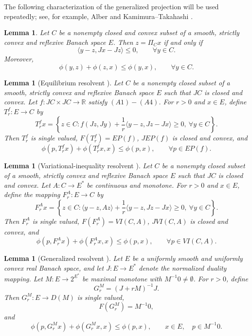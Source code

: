 \documentclass[leqno,12pt]{amsart}
\newtheorem{lemma}[theorem]{Lemma}
\theoremstyle{definition}
\numberwithin{equation}{section}
\begin{document}
The following characterization of the generalized projection will be used repeatedly; see, for example, Alber \cite{Alber1996} and Kamimura--Takahashi \cite{KamimuraTakahashi2002}.

\begin{lemma}\label{projectionlemma}
Let $C$ be a nonempty closed and convex subset of a smooth, strictly convex and reflexive Banach space $E$. Then $z=\Pi_Cx$ if and only if
\[
\langle y-z,Jx-Jz\rangle\leq 0,\qquad \forall y\in C.
\]
Moreover,
\[
\phi(y,z)+\phi(z,x)\leq \phi(y,x),\qquad \forall y\in C.
\]
\end{lemma}


\begin{lemma}[Equilibrium resolvent \cite{TakahashiZembayashi2008}]\label{EPrezolvent}
Let $C$ be a nonempty closed subset of a smooth, strictly convex and reflexive Banach space $E$ such that $JC$ is closed and convex. Let $f:JC\times JC\to\mathbb{R}$ satisfy $(A1)-(A4)$. For $r>0$ and $x\in E$, define $T_r^f:E\to C$ by
\[
T_r^f x=\left\{z\in C:f(Jz,Jy)+\frac{1}{r}\langle y-z,Jz-Jx\rangle\geq 0,\ \forall y\in C\right\}.
\]
Then $T_r^f$ is single valued, $F(T_r^f)=EP(f)$, $JEP(f)$ is closed and convex, and
\[
\phi(p,T_r^f x)+\phi(T_r^f x,x)\leq \phi(p,x),\qquad \forall p\in EP(f).
\]
\end{lemma}

\begin{lemma}[Variational-inequality resolvent \cite{ZegeyeShahzad2014}]\label{VIrezolvent}
Let $C$ be a nonempty closed subset of a smooth, strictly convex and reflexive Banach space $E$ such that $JC$ is closed and convex. Let $A:C\to E^{*}$ be continuous and monotone. For $r>0$ and $x\in E$, define the mapping $F_r^A:E\to C$ by
\[
F_r^A x=\left\{z\in C:\langle y-z,Az\rangle+\frac{1}{r}\langle y-z,Jz-Jx\rangle\geq 0,\ \forall y\in C\right\}.
\]
Then $F_r^A$ is single valued, $F(F_r^A)=VI(C,A)$, $JVI(C,A)$ is closed and convex, and
\[
\phi(p,F_r^A x)+\phi(F_r^A x,x)\leq \phi(p,x),\qquad \forall p\in VI(C,A).
\]
\end{lemma}

\begin{lemma}[Generalized resolvent \cite{KamimuraKohsakaTakahashi2004,KohsakaTakahashi2004,AoyamaKimuraTakahashi2008}]\label{MMresolvent}
Let $E$ be a uniformly smooth and uniformly convex real Banach space, and let
$J:E\to E^*$ denote the normalized duality mapping. Let
$M:E\to 2^{E^{*}}$ be maximal monotone with $M^{-1}0\neq\emptyset$. For
$r>0$, define
\[
G_r^M=(J+rM)^{-1}J.
\]
Then $G_r^M:E\to D(M)$ is single valued,
\[
F(G_r^M)=M^{-1}0,
\]
and
\[
\phi(p,G_r^Mx)+\phi(G_r^Mx,x)\leq \phi(p,x),
\qquad x\in E,\quad p\in M^{-1}0.
\]
\end{lemma}
\end{document}
